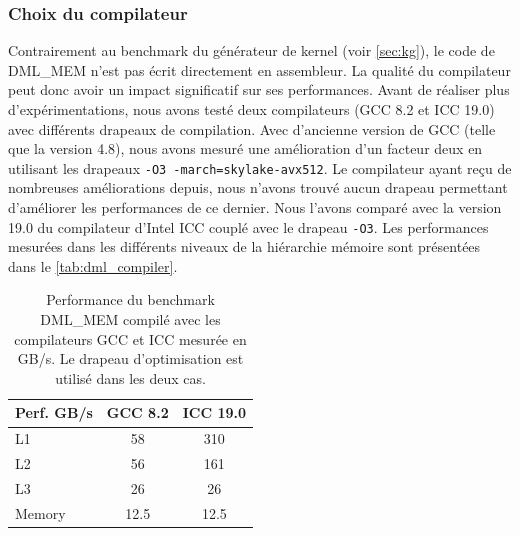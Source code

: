     \subsubsection{Choix du compilateur}
    
        Contrairement au benchmark du générateur de kernel (voir \autoref{sec:kg}), le code de DML\_MEM n'est pas écrit directement en assembleur. La qualité du compilateur peut donc avoir un impact significatif sur ses performances. Avant de réaliser plus d'expérimentations, nous avons testé deux compilateurs (GCC 8.2 et ICC 19.0) avec différents drapeaux de compilation. Avec d'ancienne version de GCC (telle que la version 4.8), nous avons mesuré une amélioration d'un facteur deux en utilisant les drapeaux \verb|-O3 -march=skylake-avx512|. Le compilateur ayant reçu de nombreuses améliorations depuis, nous n'avons trouvé aucun drapeau permettant d'améliorer les performances de ce dernier. Nous l'avons comparé avec la version 19.0 du compilateur d'Intel ICC couplé avec le drapeau \verb|-O3|. Les performances mesurées dans les différents niveaux de la hiérarchie mémoire sont présentées dans le \autoref{tab:dml_compiler}.

        \begin{table}[h!]
        \centering
        \begin{tabular}{|l|c|c|}
        \hline
        Perf. GB/s & GCC 8.2 & ICC 19.0 \\ \hline
        L1 & 58 & 310 \\ \hline
        L2 & 56 & 161 \\ \hline
        L3 & 26 & 26 \\ \hline
        Memory & 12.5 & 12.5 \\ \hline
        \end{tabular}%
        \caption{Performance du benchmark DML\_MEM compilé avec les compilateurs GCC et ICC mesurée en GB/s. Le drapeau d'optimisation  est utilisé dans les deux cas.}
        \label{tab:dml_compiler}
        \end{table}

